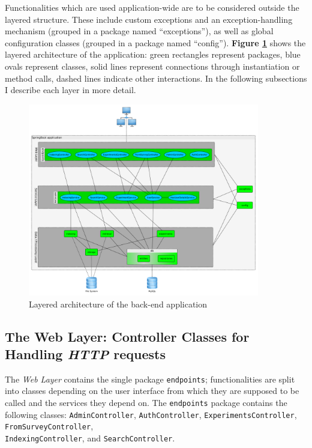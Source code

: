 \documentclass[a4paper]{usiinfbachelorproject}
\begin{document}
Functionalities which are used application-wide are to be considered outside the layered structure. These include
custom exceptions and an exception-handling mechanism (grouped in a package named ``exceptions''), as well as global
configuration classes (grouped in a package named ``config''). \textbf{Figure \ref{fig:archLayers}} shows the
layered architecture of the application: green rectangles represent packages, blue ovals represent classes,
solid lines represent connections through instantiation or method calls, dashed lines indicate other interactions.
In the following subsections I describe each layer in more detail.


\begin{figure}[h!]
\centering
\includegraphics[width=0.9\textwidth]{figures/archLayers}
\caption{Layered architecture of the back-end application}
\label{fig:archLayers}
\end{figure}

\subsection{\textbf{The Web Layer: Controller Classes for Handling \emph{HTTP} requests}} \label{sec:archWebLayer}

The \emph{Web Layer} contains the single package \texttt{endpoints}; functionalities are split into classes depending on the
user interface from which they are supposed to be called and the services they depend on.
The \texttt{endpoints} package contains the following classes:
\texttt{AdminController},
\texttt{AuthController},
\texttt{ExperimentsController},
\texttt{FromSurveyController}, \\
\texttt{IndexingController}, and
\texttt{SearchController}.
\end{document}
